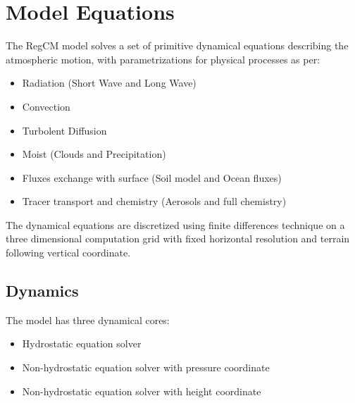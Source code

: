
\newpage

\chapter{Model Equations}

The RegCM model solves a set of primitive dynamical equations describing
the atmospheric motion, with parametrizations for physical processes as per:

\begin{itemize}
  \item Radiation (Short Wave and Long Wave)
  \item Convection
  \item Turbolent Diffusion
  \item Moist (Clouds and Precipitation)
  \item Fluxes exchange with surface (Soil model and Ocean fluxes)
  \item Tracer transport and chemistry (Aerosols and full chemistry)
\end{itemize}

The dynamical equations are discretized using finite differences technique
on a three dimensional computation grid with fixed horizontal resolution
and terrain following vertical coordinate.

\section{Dynamics}
The model has three dynamical cores:

\begin{itemize}
\item Hydrostatic equation solver
\item Non-hydrostatic equation solver with pressure coordinate
\item Non-hydrostatic equation solver with height coordinate
\end{itemize}

